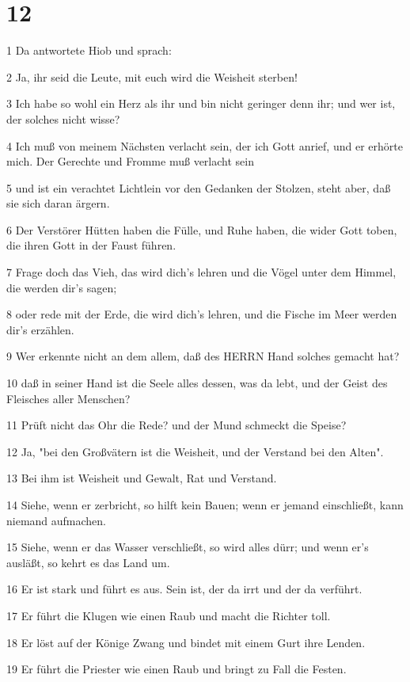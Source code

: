 \chapter{12}

\par 1 Da antwortete Hiob und sprach:
\par 2 Ja, ihr seid die Leute, mit euch wird die Weisheit sterben!
\par 3 Ich habe so wohl ein Herz als ihr und bin nicht geringer denn ihr; und wer ist, der solches nicht wisse?
\par 4 Ich muß von meinem Nächsten verlacht sein, der ich Gott anrief, und er erhörte mich. Der Gerechte und Fromme muß verlacht sein
\par 5 und ist ein verachtet Lichtlein vor den Gedanken der Stolzen, steht aber, daß sie sich daran ärgern.
\par 6 Der Verstörer Hütten haben die Fülle, und Ruhe haben, die wider Gott toben, die ihren Gott in der Faust führen.
\par 7 Frage doch das Vieh, das wird dich's lehren und die Vögel unter dem Himmel, die werden dir's sagen;
\par 8 oder rede mit der Erde, die wird dich's lehren, und die Fische im Meer werden dir's erzählen.
\par 9 Wer erkennte nicht an dem allem, daß des HERRN Hand solches gemacht hat?
\par 10 daß in seiner Hand ist die Seele alles dessen, was da lebt, und der Geist des Fleisches aller Menschen?
\par 11 Prüft nicht das Ohr die Rede? und der Mund schmeckt die Speise?
\par 12 Ja, "bei den Großvätern ist die Weisheit, und der Verstand bei den Alten".
\par 13 Bei ihm ist Weisheit und Gewalt, Rat und Verstand.
\par 14 Siehe, wenn er zerbricht, so hilft kein Bauen; wenn er jemand einschließt, kann niemand aufmachen.
\par 15 Siehe, wenn er das Wasser verschließt, so wird alles dürr; und wenn er's ausläßt, so kehrt es das Land um.
\par 16 Er ist stark und führt es aus. Sein ist, der da irrt und der da verführt.
\par 17 Er führt die Klugen wie einen Raub und macht die Richter toll.
\par 18 Er löst auf der Könige Zwang und bindet mit einem Gurt ihre Lenden.
\par 19 Er führt die Priester wie einen Raub und bringt zu Fall die Festen.
